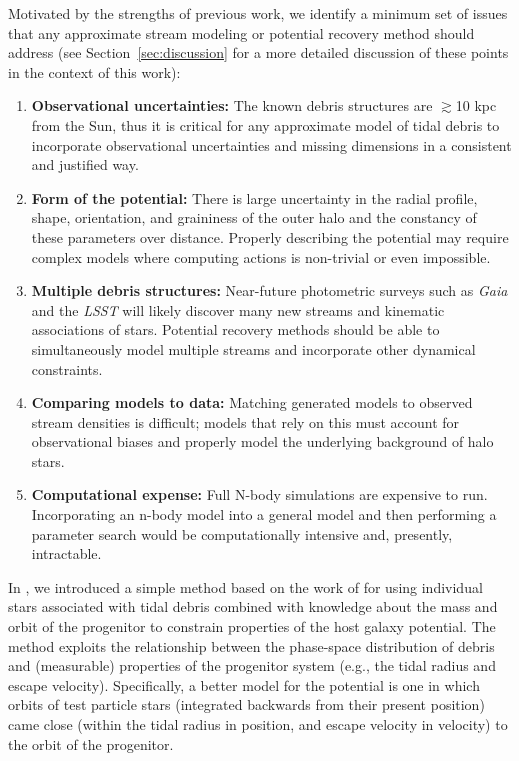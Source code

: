 \documentclass[letterpaper,12pt,preprint]{aastex}
\newcommand{\project}[1]{\textsl{#1}}
\newcommand{\gaia}{\project{Gaia}}
\begin{document}
Motivated by the strengths of previous work, we identify a minimum set of issues that any approximate stream modeling or potential recovery method should address (see Section~\ref{sec:discussion} for a more detailed discussion of these points in the context of this work):
\begin{enumerate}
	\item \textbf{Observational uncertainties:} The known debris structures are $\gtrsim$10 kpc from the Sun, thus it is critical for any approximate model of tidal debris to incorporate observational uncertainties and missing dimensions in a consistent and justified way. 
	\item \textbf{Form of the potential:} There is large uncertainty in the radial profile, shape, orientation, and graininess of the outer halo and the constancy of these parameters over distance. Properly describing the potential may require complex models where computing actions is non-trivial or even impossible.
	\item \textbf{Multiple debris structures:} Near-future photometric surveys such as \gaia\, and the \project{LSST} will likely discover many new streams and kinematic associations of stars. Potential recovery methods should be able to simultaneously model multiple streams and incorporate other dynamical constraints.
	\item \textbf{Comparing models to data:} Matching generated models to observed stream densities is difficult; models that rely on this must account for observational biases and properly model the underlying background of halo stars. 
	\item \textbf{Computational expense:} Full N-body simulations are expensive to run. Incorporating an n-body model into a general model and then performing a parameter search would be computationally intensive and, presently, intractable. 
\end{enumerate}

In \citet{apw13}, we introduced a simple method based on the work of \citet{johnston99} for using individual stars associated with tidal debris combined with knowledge about the mass and orbit of the progenitor to constrain properties of the host galaxy potential. The method exploits the relationship between the phase-space distribution of debris and (measurable) properties of the progenitor system (e.g., the tidal radius and escape velocity).  Specifically, a better model for the potential is one in which orbits of test particle stars (integrated backwards from their present position) came close (within the tidal radius in position, and escape velocity in velocity) to the orbit of the progenitor. 
\end{document}
